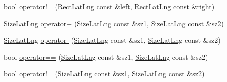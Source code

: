 \begin{DoxyCompactItemize}
\item 
bool \hyperlink{group___o_p_map_widget_ga8957984d0dfe65bb3042d9fd7f36f043}{operator!=} (\hyperlink{structinternals_1_1_rect_lat_lng}{Rect\-Lat\-Lng} const \&\hyperlink{glext_8h_a85b8f6c07fbc1fb5d77c2ae090f21995}{left}, \hyperlink{structinternals_1_1_rect_lat_lng}{Rect\-Lat\-Lng} const \&\hyperlink{glext_8h_a5ffadbbacc6b89cf6218bc43b384d3fe}{right})
\item 
\hyperlink{structinternals_1_1_size_lat_lng}{Size\-Lat\-Lng} \hyperlink{group___o_p_map_widget_ga40db61334553eb3b32aee299116e616a}{operator+} (\hyperlink{structinternals_1_1_size_lat_lng}{Size\-Lat\-Lng} const \&sz1, \hyperlink{structinternals_1_1_size_lat_lng}{Size\-Lat\-Lng} const \&sz2)
\item 
\hyperlink{structinternals_1_1_size_lat_lng}{Size\-Lat\-Lng} \hyperlink{group___o_p_map_widget_gab6ce9f24cd5044e4c558c513bdb96efc}{operator-\/} (\hyperlink{structinternals_1_1_size_lat_lng}{Size\-Lat\-Lng} const \&sz1, \hyperlink{structinternals_1_1_size_lat_lng}{Size\-Lat\-Lng} const \&sz2)
\item 
bool \hyperlink{group___o_p_map_widget_gad24bfed7e42c2af0ee0f764c6cc34611}{operator==} (\hyperlink{structinternals_1_1_size_lat_lng}{Size\-Lat\-Lng} const \&sz1, \hyperlink{structinternals_1_1_size_lat_lng}{Size\-Lat\-Lng} const \&sz2)
\item 
bool \hyperlink{group___o_p_map_widget_gaa65f8008332c3773a009a9d307330a5d}{operator!=} (\hyperlink{structinternals_1_1_size_lat_lng}{Size\-Lat\-Lng} const \&sz1, \hyperlink{structinternals_1_1_size_lat_lng}{Size\-Lat\-Lng} const \&sz2)
\end{DoxyCompactItemize}
